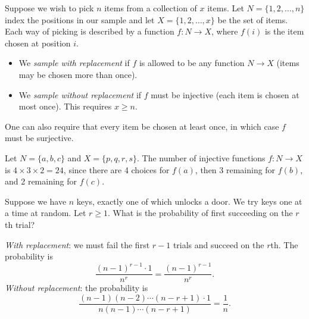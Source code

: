 \documentclass[a4paper]{article}
\begin{document}
\begin{defi}
  Suppose we wish to pick $n$ items from a collection of $x$ items. Let $N = \{1, 2, \dotsc, n\}$ index the positions in our sample and let $X = \{1, 2, \dotsc, x\}$ be the set of items. Each way of picking is described by a function $f\colon N\to X$, where $f(i)$ is the item chosen at position $i$.
  \begin{itemize}
    \item We \emph{sample with replacement} if $f$ is allowed to be any function $N \to X$ (items may be chosen more than once).
    \item We \emph{sample without replacement} if $f$ must be injective (each item is chosen at most once). This requires $x \geq n$.
  \end{itemize}
\end{defi}

\begin{remark}
  One can also require that every item be chosen at least once, in which case $f$ must be surjective.
\end{remark}

\begin{eg}
  Let $N = \{a, b, c\}$ and $X = \{p, q, r, s\}$. The number of injective functions $f\colon N\to X$ is $4 \times 3 \times 2 = 24$, since there are 4 choices for $f(a)$, then 3 remaining for $f(b)$, and 2 remaining for $f(c)$.
\end{eg}

\begin{eg}[Keys]
  Suppose we have $n$ keys, exactly one of which unlocks a door. We try keys one at a time at random. Let $r \geq 1$. What is the probability of first succeeding on the $r$th trial?

  \emph{With replacement}: we must fail the first $r - 1$ trials and succeed on the $r$th. The probability is
  \[
    \frac{(n - 1)^{r - 1} \cdot 1}{n^r} = \frac{(n - 1)^{r - 1}}{n^r}.
  \]
  \emph{Without replacement}: the probability is
  \[
    \frac{(n - 1)(n - 2)\cdots (n - r + 1) \cdot 1}{n(n - 1) \cdots (n - r + 1)} = \frac{1}{n}.
  \]
\end{eg}
\end{document}
